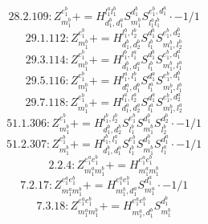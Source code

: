 \documentclass[letterpaper,10pt,fleqn,leqno,onecolumn]{article}
\begin{document}
\begin{equation} \;\;\;\;\;\;  28.2.109: Z^{e_{1}^{b}}_{m_{1}^{b}}+=H^{l_{1}^{a}l_{1}^{b}}_{d_{1}^{b},d_{1}^{a}}S^{d_{1}^{b}}_{m_{1}^{b}}S^{e_{1}^{b},d_{1}^{a}}_{l_{1}^{a}l_{1}^{b}}\cdot -1/1 \end{equation}
\begin{equation} \;\;\;\;\;\;  29.1.112: Z^{e_{1}^{b}}_{m_{1}^{b}}+=H^{l_{1}^{b},l_{2}^{b}}_{d_{1}^{b},d_{2}^{b}}S^{d_{1}^{b}}_{l_{1}^{b}}S^{e_{1}^{b},d_{2}^{b}}_{m_{1}^{b},l_{2}^{b}} \end{equation}
\begin{equation} \;\;\;\;\;\;  29.3.114: Z^{e_{1}^{b}}_{m_{1}^{b}}+=H^{l_{1}^{b},l_{1}^{a}}_{d_{1}^{b},d_{1}^{a}}S^{d_{1}^{b}}_{l_{1}^{b}}S^{e_{1}^{b},d_{1}^{a}}_{m_{1}^{b},l_{1}^{a}} \end{equation}
\begin{equation} \;\;\;\;\;\;  29.5.116: Z^{e_{1}^{b}}_{m_{1}^{b}}+=H^{l_{1}^{a},l_{1}^{b}}_{d_{1}^{a},d_{1}^{b}}S^{d_{1}^{a}}_{l_{1}^{a}}S^{e_{1}^{b},d_{1}^{b}}_{m_{1}^{b},l_{1}^{b}} \end{equation}
\begin{equation} \;\;\;\;\;\;  29.7.118: Z^{e_{1}^{b}}_{m_{1}^{b}}+=H^{l_{1}^{a},l_{2}^{a}}_{d_{1}^{a},d_{2}^{a}}S^{d_{1}^{a}}_{l_{1}^{a}}S^{e_{1}^{b},d_{2}^{a}}_{m_{1}^{b},l_{2}^{a}} \end{equation}
\begin{equation} \;\;\;\;\;\;  51.1.306: Z^{e_{1}^{b}}_{m_{1}^{b}}+=H^{l_{1}^{b},l_{2}^{b}}_{d_{1}^{b},d_{2}^{b}}S^{e_{1}^{b}}_{l_{1}^{b}}S^{d_{1}^{b}}_{m_{1}^{b}}S^{d_{2}^{b}}_{l_{2}^{b}}\cdot -1/1 \end{equation}
\begin{equation} \;\;\;\;\;\;  51.2.307: Z^{e_{1}^{b}}_{m_{1}^{b}}+=H^{l_{1}^{b},l_{1}^{a}}_{d_{1}^{b},d_{1}^{a}}S^{e_{1}^{b}}_{l_{1}^{b}}S^{d_{1}^{b}}_{m_{1}^{b}}S^{d_{1}^{a}}_{l_{1}^{a}}\cdot -1/1 \end{equation}
\begin{equation} \;\;\;\;\;\;  2.2.4: Z^{e_{1}^{a}e_{1}^{b}}_{m_{1}^{a}m_{1}^{b}}+=H^{e_{1}^{a}e_{1}^{b}}_{m_{1}^{a}m_{1}^{b}} \end{equation}
\begin{equation} \;\;\;\;\;\;  7.2.17: Z^{e_{1}^{a}e_{1}^{b}}_{m_{1}^{a}m_{1}^{b}}+=H^{e_{1}^{a}e_{1}^{b}}_{m_{1}^{b},d_{1}^{a}}S^{d_{1}^{a}}_{m_{1}^{a}}\cdot -1/1 \end{equation}
\begin{equation} \;\;\;\;\;\;  7.3.18: Z^{e_{1}^{a}e_{1}^{b}}_{m_{1}^{a}m_{1}^{b}}+=H^{e_{1}^{a}e_{1}^{b}}_{m_{1}^{a},d_{1}^{b}}S^{d_{1}^{b}}_{m_{1}^{b}} \end{equation}
\end{document}

